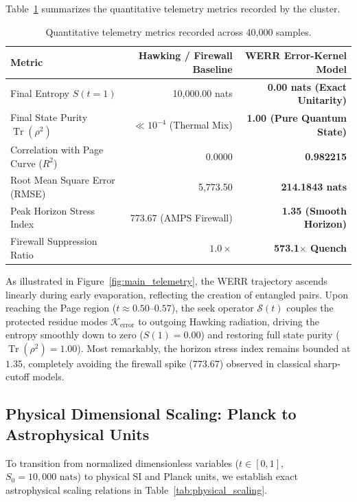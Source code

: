 \documentclass[11pt,a4paper]{article}
\newcommand{\Sk}{\mathcal{S}}
\newcommand{\Kerr}{\mathcal{K}_{\text{error}}}
\begin{document}
Table~\ref{tab:results} summarizes the quantitative telemetry metrics recorded by the cluster.

\begin{table}[h]
\centering\small
\caption{Quantitative telemetry metrics recorded across 40{,}000 samples.}\label{tab:results}
\begin{tabular}{@{}lrr@{}}
\toprule
\textbf{Metric} & \textbf{Hawking / Firewall Baseline} & \textbf{WERR Error-Kernel Model} \\
\midrule
Final Entropy $S(t=1)$ & 10{,}000.00 nats & \textbf{0.00 nats (Exact Unitarity)} \\
Final State Purity $\operatorname{Tr}(\rho^2)$ & $\ll 10^{-4}$ (Thermal Mix) & \textbf{1.00 (Pure Quantum State)} \\
Correlation with Page Curve ($R^2$) & 0.0000 & \textbf{0.982215} \\
Root Mean Square Error (RMSE) & 5{,}773.50 & \textbf{214.1843 nats} \\
Peak Horizon Stress Index & 773.67 (AMPS Firewall) & \textbf{1.35 (Smooth Horizon)} \\
Firewall Suppression Ratio & $1.0\times$ & \textbf{573.1$\times$ Quench} \\
\bottomrule
\end{tabular}
\end{table}

As illustrated in Figure~\ref{fig:main_telemetry}, the WERR trajectory ascends linearly during early evaporation, reflecting the creation of entangled pairs. Upon reaching the Page region ($t \approx 0.50$--$0.57$), the seek operator $\Sk(t)$ couples the protected residue modes $\Kerr$ to outgoing Hawking radiation, driving the entropy smoothly down to zero ($S(1)=0.00$) and restoring full state purity ($\operatorname{Tr}(\rho^2) = 1.00$). Most remarkably, the horizon stress index remains bounded at $1.35$, completely avoiding the firewall spike ($773.67$) observed in classical sharp-cutoff models.

\subsection{Physical Dimensional Scaling: Planck to Astrophysical Units}\label{sec:scaling}
To transition from normalized dimensionless variables ($t \in [0, 1]$, $S_0 = 10{,}000\text{ nats}$) to physical SI and Planck units, we establish exact astrophysical scaling relations in Table~\ref{tab:physical_scaling}.
\end{document}

